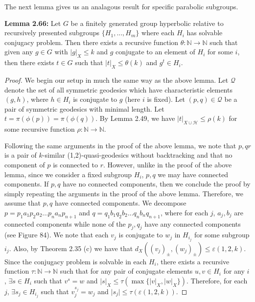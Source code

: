 \documentclass[12pt]{article}
\newcommand{\vs}{\vskip10pt}
\begin{document}
	The next lemma gives us an analagous result for specific parabolic subgroups. 
	
	\vs 
	
	\textbf{Lemma 2.66: } Let $G$ be a finitely generated group hyperbolic relative to recursively presented subgroups $\{H_1,...,H_m\}$ where each $H_i$ has solvable conjugacy problem. Then there exists a recursive function $\theta: \mathbb{N} \rightarrow \mathbb{N}$ such that given any $g \in G$ with $\vert g \vert_X \leq k$ and $g$ conjugate to an element of $H_i$ for some $i$, then there exists $t \in G$ such that $\vert t \vert_X \leq \theta(k)$ and $g^t \in H_i$. 
	
	\begin{proof}
		
		We begin our setup in much the same way as the above lemma. Let $\mathcal{Q}$ denote the set of all symmetric geodesics which have characteristic elements $(g,h)$, where $h \in H_i$ is conjugate to $g$ (here $i$ is fixed). Let $(p,q) \in \mathcal{Q}$ be a pair of symmetric geodesics with minimal length. Let $t = \pi(\phi(p)) = \pi(\phi(q))$. By Lemma 2.49, we have $\vert t \vert_{X \cup \mathcal{H}} \leq \rho(k)$ for some recursive function $\rho : \mathbb{N} \rightarrow \mathbb{N}$. 
		
		\vs 
		
		Following the same arguments in the proof of the above lemma, we note that $p, qr$ is a pair of $k$-similar (1,2)-quasi-geodesics without backtracking and that no component of $p$ is connected to $r$. However, unlike in the proof of the above lemma, since we consider a fixed subgroup $H_i$, $p,q$ we may have connected components. If $p,q$ have no connected components, then we conclude the proof by simply repeating the arguments in the proof of the above lemma. Therefore, we assume that $p,q$ have connected components. We decompose $p = p_1 a_1 p_2 a_2 ... p_n a_n p_{n+1}$ and $q = q_1 b_1 q_2 b_2 ... q_n b_n q_{n+1}$, where for each $j$, $a_j, b_j$ are connected components while none of the $p_j, q_j$ have any connected components (see Figure 84). We note that each $v_j$ is conjugate to $w_j$ in $H_{i_j}$ for some subgroup $i_j$. Also, by Theorem 2.35 (c) we have that $d_X((v_j)_{\pm}, (w_j)_{\pm}) \leq \varepsilon(1,2,k)$. Since the conjugacy problem is solvable in each $H_i$, there exists a recursive function $\tau: \mathbb{N} \rightarrow \mathbb{N}$ such that for any pair of conjugate elements $u,v \in H_i$ for any $i$, $\exists s \in H_i$ such that $v^s = w$ and $\vert s \vert_X \leq \tau(\max \{\vert v \vert_X, \vert w \vert_X\})$. Therefore, for each $j$, $\exists s_j \in H_{i_j}$ such that $v_j^{s_j} = w_j$ and $\vert s_j \vert \leq \tau(\varepsilon(1,2,k))$. 
		

\end{proof}
\end{document}
